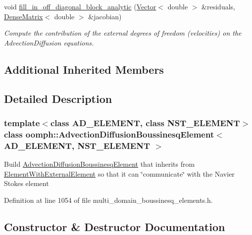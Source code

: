 \begin{DoxyCompactItemize}
void \hyperlink{classoomph_1_1AdvectionDiffusionBoussinesqElement_a9e859b487d8398ae696de72104c76271}{fill\+\_\+in\+\_\+off\+\_\+diagonal\+\_\+block\+\_\+analytic} (\hyperlink{classoomph_1_1Vector}{Vector}$<$ double $>$ \&residuals, \hyperlink{classoomph_1_1DenseMatrix}{Dense\+Matrix}$<$ double $>$ \&jacobian)
\begin{DoxyCompactList}\small\item\em Compute the contribution of the external degrees of freedom (velocities) on the Advection\+Diffusion equations. \end{DoxyCompactList}\end{DoxyCompactItemize}
\subsection*{Additional Inherited Members}


\subsection{Detailed Description}
\subsubsection*{template$<$class A\+D\+\_\+\+E\+L\+E\+M\+E\+NT, class N\+S\+T\+\_\+\+E\+L\+E\+M\+E\+NT$>$\newline
class oomph\+::\+Advection\+Diffusion\+Boussinesq\+Element$<$ A\+D\+\_\+\+E\+L\+E\+M\+E\+N\+T, N\+S\+T\+\_\+\+E\+L\+E\+M\+E\+N\+T $>$}

Build \hyperlink{classoomph_1_1AdvectionDiffusionBoussinesqElement}{Advection\+Diffusion\+Boussinesq\+Element} that inherits from \hyperlink{classoomph_1_1ElementWithExternalElement}{Element\+With\+External\+Element} so that it can \char`\"{}communicate\char`\"{} with the Navier Stokes element 

Definition at line 1054 of file multi\+\_\+domain\+\_\+boussinesq\+\_\+elements.\+h.



\subsection{Constructor \& Destructor Documentation}
\mbox{\label{classoomph_1_1AdvectionDiffusionBoussinesqElement_a733c18518938e3b85e06de5a618cd49f}} 
